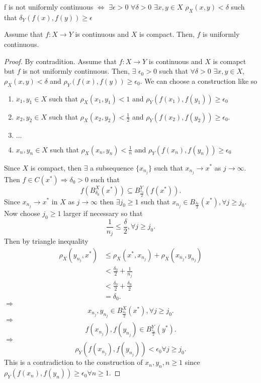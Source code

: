 \documentclass[a4paper]{article}
\begin{document}
\begin{definition}
  f is not uniformly continuous $\iff$ $\exists \epsilon > 0$ $\forall \delta > 0$  $\exists x,y \in X$ $\rho_X (x,y) < \delta$ such that  $\delta_Y (f(x), f(y)) \geq \epsilon$
\end{definition}

\begin{theorem}
  Assume that $f:X \to Y$ is continuous and  $X$ is compact. Then,  $f$ is uniformly continuous.

   \begin{proof}
    By contradition. Assume that $f:X \to Y$ is continuous and  $X$ is comapct but  $f$ is not uniformly continuous. Then, $\exists $ $\epsilon_0 > 0$ such that  $\forall \delta > 0$  $\exists x,y \in X$, $\rho_X(x,y) < \delta$ and  $\rho_{Y} (f(x), f(y)) \geq \epsilon_0$. We can choose a construction like so
    \begin{enumerate}
      \item $x_1,y_1 \in X$ such that $\rho_X (x_1,y_1) < 1$ and  $\rho_Y(f(x_1),f(y_1)) \geq \epsilon_0$
      \item  $x_2,y_2 \in X$ such that $\rho_X (x_2,y_2) < \frac{1}{2}$ and  $\rho_Y(f(x_2),f(y_2)) \geq \epsilon_0$.
      \item $\ldots$
      \item  $x_n,y_n \in X$ such that $\rho_X (x_n,y_n) < \frac{1}{n}$ and  $\rho_Y(f(x_n),f(y_n)) \geq \epsilon_0$
    \end{enumerate}
    Since $X$ is compact, then  $\exists $ a subsequence $\{x_{n_j}\} $ such that $x_{n_j} \to x^{*}$ as $j \to \infty$. Then $f \in C(x^{*}) \Rightarrow \delta_0 > 0$ such that
    \[
    f(B_{\delta_0}^{X} (x^*)) \subseteq B_{\frac{\epsilon_0}{2}}^{Y}(f(x^*))
    .\]
    Since $x_{n_j} \to x^{*}$ in $X$ as  $j \to \infty$ then  $\exists j_0 \geq 1$ such that $x_{n_j} \in B_{\frac{\delta_0}{2}}\left( x^{*} \right) , \forall j \geq j_0$. Now choose $j_0 \geq 1$ larger if necessary so that 
     \[
    \frac{1}{n_j} \leq \frac{\delta}{2}, \forall j \geq j_0
    .\] 
  Then by triangle inequality
  \begin{align*}
    \rho_X (y_{n_j}, x^{*}) &\leq \rho_X (x^{*}, x_{n_j}) + \rho_X(x_{n_j}, y_{n_j})\\
                            &< \frac{\delta_0}{2} + \frac{1}{n_j} \\
                            &< \frac{\delta_0}{2} + \frac{\delta_0}{2} \\
                            &= \delta_0
  .\end{align*}
  $\Rightarrow$ 
   \[
  x_{n_j}, y_{n_j} \in B_{\frac{\delta_0}{2}}^{X} (x^{*}), \forall j \geq j_0
  .\]
  $\Rightarrow$
   \[
  f(x_{n_j}), f(y_{n_j}) \in B_{\frac{\epsilon_0}{2}}^{Y} (y^{*}) 
  .\] 
  $\Rightarrow$
   \[
  \rho_{Y} (f(x_{n_j}), f(y_{n_j})) < \epsilon_0 \forall j \geq j_0
  .\] 
  This is a contradiction to the construction of $x_n,y_n, n \geq 1$ since  $\rho_Y (f(x_n), f(y_n)) \geq \epsilon_0 \forall n \geq 1$.
\end{proof}


\end{theorem}
\end{document}
